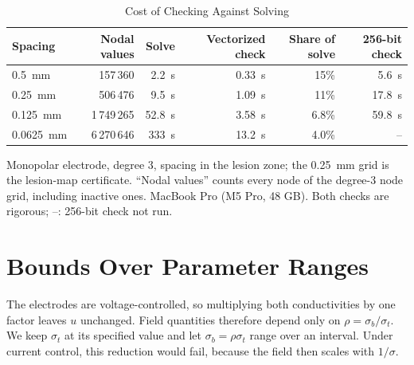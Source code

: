 \documentclass[11pt]{article}
\begin{document}
\begin{table}[t]
\centering
\caption{Cost of Checking Against Solving}\label{tab:cost}
\small
\begin{tabular}{lrrrrr}
\toprule
Spacing & Nodal values & Solve & Vectorized check & Share of solve & 256-bit check\\
\midrule
\SI{0.5}{mm} & 157\,360 & \SI{2.2}{s} & \SI{0.33}{s} & 15\% & \SI{5.6}{s}\\
\SI{0.25}{mm} & 506\,476 & \SI{9.5}{s} & \SI{1.09}{s} & 11\% & \SI{17.8}{s}\\
\SI{0.125}{mm} & 1\,749\,265 & \SI{52.8}{s} & \SI{3.58}{s} & 6.8\% & \SI{59.8}{s}\\
\SI{0.0625}{mm} & 6\,270\,646 & \SI{333}{s} & \SI{13.2}{s} & 4.0\% & --\\
\bottomrule
\end{tabular}
\par\vspace{2pt}\footnotesize\raggedright Monopolar electrode, degree 3, spacing in the lesion zone; the \SI{0.25}{mm} grid is the lesion-map certificate. ``Nodal values'' counts every node of the degree-3 node grid, including inactive ones. MacBook Pro (M5 Pro, 48 GB). Both checks are rigorous; --: 256-bit check not run.
\end{table}


\section{Bounds Over Parameter Ranges}\label{sec:ranges}

The electrodes are voltage-controlled, so multiplying both conductivities by
one factor leaves $u$ unchanged. Field quantities therefore depend only on
$\rho=\sigma_b/\sigma_t$. We keep $\sigma_t$ at its specified value and let
$\sigma_b=\rho\sigma_t$ range over an interval. Under current control, this
reduction would fail, because the field then scales with $1/\sigma$.
\end{document}
